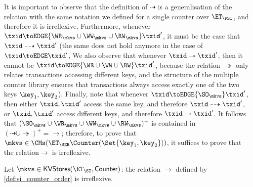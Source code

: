 It is important to observe that the definition of $\dashrightarrow$ is a generalisation of the relation 
with the same notation we defined for a single counter over $\ET_{\PSI}$, and therefore it is irreflexive. 
Furthermore, whenever $\txid \toEDGE{\WR_{\mkvs} \cup \WW_{\mkvs} \cup \RW_{\mkvs}} \txid'$, it must be the case that 
$\txid \dashrightarrow \txid'$ (the same does not hold anymore in the case of $\txid \toEDGE \txid'$, 
We also observe that whenever $\txid \twoheadrightarrow \txid'$, then it cannot be $\txid \toEDGE{\WR \cup \WW \cup \RW} \txid'$, 
because the relation $\twoheadrightarrow$ only relates transactions accessing different keys, and the structure of 
the multiple counter library ensures that transactions always access exactly one of the two keys $\key_1, \key_2$). 
Finally, note that whenever $\txid \toEDGE{\SO_{\mkvs}} \txid'$, then either $\txid, \txid'$ access the same 
key, and therefore $\txid \dashrightarrow \txid'$, or $\txid, \txid'$ access different keys, and therefore 
$\txid \twoheadrightarrow \txid'$. It follows that $(\SO_{\mkvs} \cup \WR_{\mkvs} \cup \WW_{\mkvs} \cup \RW_{\mkvs})^{+}$ 
is contained in $(\dashrightarrow \cup \twoheadrightarrow)^{+} = \rightarrow$; therefore, 
to prove that $\mkvs \in \CMs(\ET_{\SER}  \Counter(\Set{\key_1, \key_2}))$, it suffices to prove that 
the relation$\rightarrow$ is irreflexive.
%

\begin{proposition}
Let $\mkvs \in \mathsf{KVStores}(\ET_{\SI}, \mathsf{Counter})$: the relation $\rightarrow$ 
defined by \cref{def:si_counter_order} is irreflexive.
\end{proposition}

